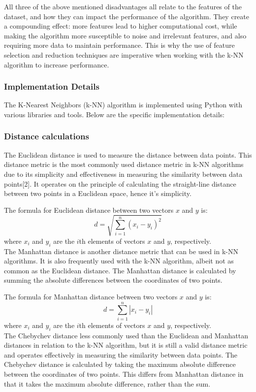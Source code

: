 All three of the above mentioned disadvantages all relate to the features of the dataset, and how they can impact the performance of the algorithm.
They create a compounding effect: more features lead to higher computational cost, while making the algorithm more susceptible to noise and irrelevant features,
and also requiring more data to maintain performance. This is why the use of feature selection and reduction techniques are imperative 
when working with the k-NN algorithm to increase performance.


\subsubsection{Implementation Details}
The K-Nearest Neighbors (k-NN) algorithm is implemented using Python with various libraries and tools.
Below are the specific implementation details:

\subsubsection*{Distance calculations}
The Euclidean distance is used to measure the distance between data points. 
This distance metric is the most commonly used distance metric in k-NN algorithms
due to its simplicity and effectiveness in measuring the similarity between data points[2].
It operates on the principle of calculating the straight-line distance between two points in a Euclidean space, hence it's simplicity.

The formula for Euclidean distance between two vectors \(x\) and \(y\) is:
\[ d = \sqrt{\sum_{i=1}^{n} (x_i - y_i)^2} \]
where \(x_i\) and \(y_i\) are the \(i\)th elements of vectors \(x\) and \(y\), respectively.\\

The Manhattan distance is another distance metric that can be used in k-NN algorithms. It is also frequently used with the k-NN algorithm,
albeit not as common as the Euclidean distance.
The Manhattan distance is calculated by summing the absolute differences between the coordinates of two points.

The formula for Manhattan distance between two vectors \(x\) and \(y\) is:
\[ d = \sum_{i=1}^{n} |x_i - y_i| \]
where \(x_i\) and \(y_i\) are the \(i\)th elements of vectors \(x\) and \(y\), respectively.\\

The Chebychev distance less commonly used than the Euclidean and Manhattan distances
in relation to the k-NN algorithm, but it is still a valid distance metric and operates effectively in measuring the similarity between data points.
The Chebychev distance is calculated by taking the maximum absolute difference between the coordinates of two points. This differs from Manhattan distance
in that it takes the maximum absolute difference, rather than the sum.

